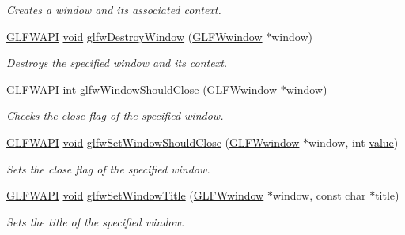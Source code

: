 \begin{DoxyCompactItemize}
\begin{DoxyCompactList}\small\item\em Creates a window and its associated context. \end{DoxyCompactList}\item 
\mbox{\hyperlink{glfw3_8h_a56da5036b2cc259351ae22fd6439bb47}{G\+L\+F\+W\+A\+PI}} \mbox{\hyperlink{glad_8h_a950fc91edb4504f62f1c577bf4727c29}{void}} \mbox{\hyperlink{group__window_ga806747476b7247d292be3711c323ea10}{glfw\+Destroy\+Window}} (\mbox{\hyperlink{group__window_ga3c96d80d363e67d13a41b5d1821f3242}{G\+L\+F\+Wwindow}} $\ast$window)
\begin{DoxyCompactList}\small\item\em Destroys the specified window and its context. \end{DoxyCompactList}\item 
\mbox{\hyperlink{glfw3_8h_a56da5036b2cc259351ae22fd6439bb47}{G\+L\+F\+W\+A\+PI}} int \mbox{\hyperlink{group__window_gaa6162f67dfa38b8beda2fea623649332}{glfw\+Window\+Should\+Close}} (\mbox{\hyperlink{group__window_ga3c96d80d363e67d13a41b5d1821f3242}{G\+L\+F\+Wwindow}} $\ast$window)
\begin{DoxyCompactList}\small\item\em Checks the close flag of the specified window. \end{DoxyCompactList}\item 
\mbox{\hyperlink{glfw3_8h_a56da5036b2cc259351ae22fd6439bb47}{G\+L\+F\+W\+A\+PI}} \mbox{\hyperlink{glad_8h_a950fc91edb4504f62f1c577bf4727c29}{void}} \mbox{\hyperlink{group__window_ga1cadeda7a1e2f224e06a8415d30741aa}{glfw\+Set\+Window\+Should\+Close}} (\mbox{\hyperlink{group__window_ga3c96d80d363e67d13a41b5d1821f3242}{G\+L\+F\+Wwindow}} $\ast$window, int \mbox{\hyperlink{glad_8h_a03aff08f73d7fde3d1a08e0abd8e84fa}{value}})
\begin{DoxyCompactList}\small\item\em Sets the close flag of the specified window. \end{DoxyCompactList}\item 
\mbox{\hyperlink{glfw3_8h_a56da5036b2cc259351ae22fd6439bb47}{G\+L\+F\+W\+A\+PI}} \mbox{\hyperlink{glad_8h_a950fc91edb4504f62f1c577bf4727c29}{void}} \mbox{\hyperlink{group__window_ga861ed3414ab8120e2f74151a666ed1dc}{glfw\+Set\+Window\+Title}} (\mbox{\hyperlink{group__window_ga3c96d80d363e67d13a41b5d1821f3242}{G\+L\+F\+Wwindow}} $\ast$window, const char $\ast$title)
\begin{DoxyCompactList}\small\item\em Sets the title of the specified window. \end{DoxyCompactList}\item 

\end{DoxyCompactItemize}
